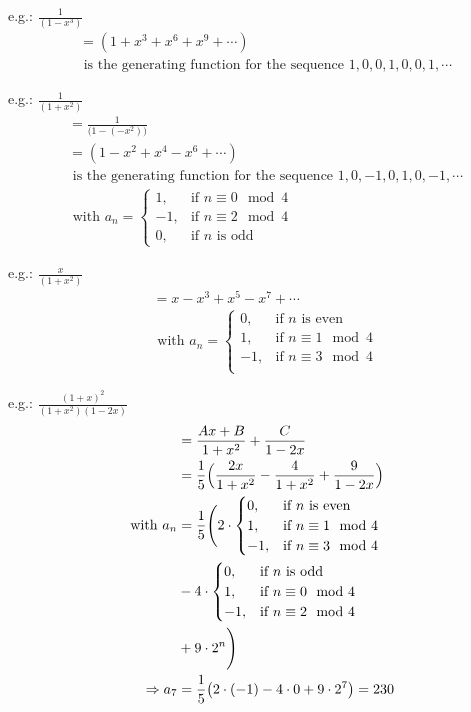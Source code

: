 \documentclass[a4paper]{article}
\begin{document}
\color{red}e.g.: \color{black} $\frac{1}{(1-x^3)}$
\begin{align*}
    &=(1+x^3+x^6+x^9+\cdots)\\
    &\text{ is the generating function for the sequence } 1,0,0,1,0,0,1,\cdots
\end{align*}

\color{red}e.g.: \color{black} $\frac{1}{(1+x^2)}$
\begin{align*}
    &=\frac{1}{\bigl(1-(-x^2)\bigr)}\\
    &=(1-x^2+x^4-x^6+\cdots)\\
    &\text{ is the generating function for the sequence } 1,0,-1,0, 1,0,-1,\cdots\\
    &\text{ with } a_n= 
        \begin{cases}
        1,  & \text{if $n\equiv 0\mod 4$} \\
        -1,  & \text{if $n\equiv 2\mod 4$} \\
        0, & \text{if $n$ is odd}
        \end{cases}
\end{align*}

\color{red}e.g.: \color{black} $\frac{x}{(1+x^2)}$
\begin{align*}
    &=x-x^3+x^5-x^7+\cdots\\
    &\text{ with } a_n= 
        \begin{cases}
        0,  & \text{if $n$ is even} \\
        1,  & \text{if $n\equiv 1\mod 4$} \\
        -1, & \text{if $n\equiv 3\mod 4$} \\
        \end{cases}
\end{align*}

\color{red}e.g.: \color{black} $\frac{(1+x)^2}{(1+x^2)(1-2x)}$
\begin{align*}
    &=\frac{Ax+B}{1+x^2}+\frac{C}{1-2x}\\
    &=\frac{1}{5}\Bigl(\frac{2x}{1+x^2}-\frac{4}{1+x^2}+\frac{9}{1-2x}\Bigr)\\
    \text{ with } a_n&=\frac{1}{5}\Biggl(2\cdot
        \begin{cases}
        0,  & \text{if $n$ is even} \\
        1,  & \text{if $n\equiv 1\mod 4$} \\
        -1, & \text{if $n\equiv 3\mod 4$} \\
        \end{cases}\\
    &
        -4\cdot
        \begin{cases}
        0,  & \text{if $n$ is odd} \\
        1,  & \text{if $n\equiv 0\mod 4$} \\
        -1, & \text{if $n\equiv 2\mod 4$} \\
        \end{cases}\\
    & 
        +9\cdot 2^n 
        \Biggr)\\
    \Rightarrow a_7&=\frac{1}{5}\bigl(2\cdot(-1)-4\cdot 0 + 9\cdot 2^7\bigr)=230
\end{align*}
\end{document}
